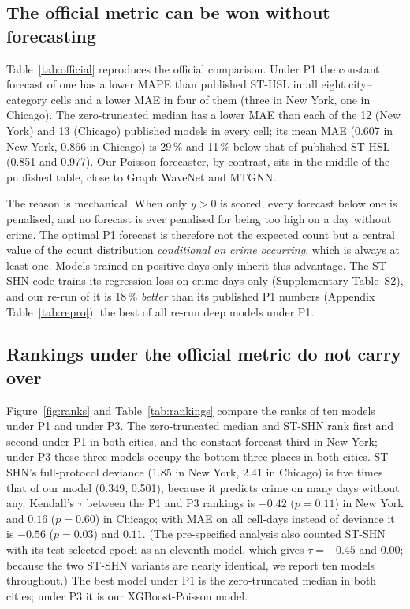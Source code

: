 \documentclass[preprint,12pt,authoryear]{elsarticle}
\begin{document}
\subsection{The official metric can be won without forecasting}\label{sec:res-exploit}
Table~\ref{tab:official} reproduces the official comparison. Under P1 the constant forecast of one has a lower MAPE than published ST-HSL in all eight city--category cells and a lower MAE in four of them (three in New York, one in Chicago). The zero-truncated median has a lower MAE than each of the 12 (New York) and 13 (Chicago) published models in every cell; its mean MAE (0.607 in New York, 0.866 in Chicago) is 29\,\% and 11\,\% below that of published ST-HSL (0.851 and 0.977). Our Poisson forecaster, by contrast, sits in the middle of the published table, close to Graph WaveNet and MTGNN.



The reason is mechanical. When only $y>0$ is scored, every forecast below one is penalised, and no forecast is ever penalised for being too high on a day without crime. The optimal P1 forecast is therefore not the expected count but a central value of the count distribution \emph{conditional on crime occurring}, which is always at least one. Models trained on positive days only inherit this advantage. The ST-SHN code trains its regression loss on crime days only (Supplementary Table~S2), and our re-run of it is 18\,\% \emph{better} than its published P1 numbers (Appendix Table~\ref{tab:repro}), the best of all re-run deep models under P1.

\subsection{Rankings under the official metric do not carry over}\label{sec:res-rank}
Figure~\ref{fig:ranks} and Table~\ref{tab:rankings} compare the ranks of ten models under P1 and under P3. The zero-truncated median and ST-SHN rank first and second under P1 in both cities, and the constant forecast third in New York; under P3 these three models occupy the bottom three places in both cities. ST-SHN's full-protocol deviance (1.85 in New York, 2.41 in Chicago) is five times that of our model (0.349, 0.501), because it predicts crime on many days without any. Kendall's $\tau$ between the P1 and P3 rankings is $-0.42$ ($p=0.11$) in New York and $0.16$ ($p=0.60$) in Chicago; with MAE on all cell-days instead of deviance it is $-0.56$ ($p=0.03$) and $0.11$. (The pre-specified analysis also counted ST-SHN with its test-selected epoch as an eleventh model, which gives $\tau=-0.45$ and $0.00$; because the two ST-SHN variants are nearly identical, we report ten models throughout.) The best model under P1 is the zero-truncated median in both cities; under P3 it is our XGBoost-Poisson model.
\end{document}
